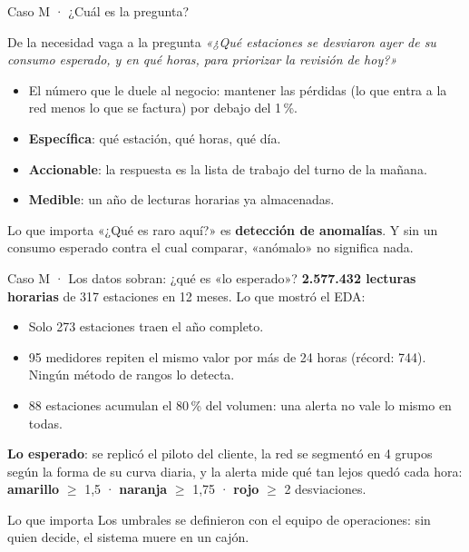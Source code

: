 \documentclass{beamer}
\begin{document}
\begin{frame}{Caso M · ¿Cuál es la pregunta?}
\small
\begin{block}{De la necesidad vaga a la pregunta}
\centering
\emph{«¿Qué estaciones se desviaron ayer de su consumo esperado, y en qué horas, para priorizar la revisión de hoy?»}
\end{block}

\vspace{0.1cm}
\footnotesize
\begin{itemize} \setlength{\itemsep}{0.08cm}
  \item El número que le duele al negocio: mantener las pérdidas (lo que entra a la red menos lo que se factura) por debajo del 1\,\%.
  \item \textcolor{verdeok}{\textbf{Específica}}: qué estación, qué horas, qué día.
  \item \textcolor{verdeok}{\textbf{Accionable}}: la respuesta es la lista de trabajo del turno de la mañana.
  \item \textcolor{verdeok}{\textbf{Medible}}: un año de lecturas horarias ya almacenadas.
\end{itemize}
\begin{alertblock}{Lo que importa}
«¿Qué es raro aquí?» es \textbf{detección de anomalías}. Y sin un consumo esperado contra el cual comparar, «anómalo» no significa nada.
\end{alertblock}
\end{frame}

\begin{frame}{Caso M · Los datos sobran: ¿qué es «lo esperado»?}
\footnotesize
\textbf{2.577.432 lecturas horarias} de 317 estaciones en 12 meses. Lo que mostró el EDA:
\begin{itemize} \setlength{\itemsep}{0.08cm}
  \item Solo 273 estaciones traen el año completo.
  \item 95 medidores repiten el mismo valor por más de 24 horas (récord: 744). Ningún método de rangos lo detecta.
  \item 88 estaciones acumulan el 80\,\% del volumen: una alerta no vale lo mismo en todas.
\end{itemize}

\vspace{0.05cm}
\textbf{Lo esperado}: se replicó el piloto del cliente, la red se segmentó en 4 grupos según la forma de su curva diaria, y la alerta mide qué tan lejos quedó cada hora: \textcolor{amarillal}{\textbf{amarillo}} $\geq$ 1,5 · \textcolor{naranjal}{\textbf{naranja}} $\geq$ 1,75 · \textcolor{rojoal}{\textbf{rojo}} $\geq$ 2 desviaciones.
\begin{alertblock}{Lo que importa}
Los umbrales se definieron con el equipo de operaciones: sin quien decide, el sistema muere en un cajón.
\end{alertblock}
\end{frame}
\end{document}
